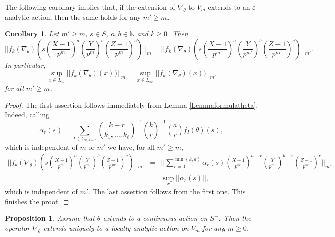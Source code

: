 \documentclass[10pt, oneside]{amsart}
\numberwithin{equation}{subsection}
\newtheorem{proposition}[equation]{Proposition}
\newtheorem{corollary}[equation]{Corollary}
\theoremstyle{definition}
\theoremstyle{remark}
\def\N{{\mathbb{N}}}
\def\epsilon{\varepsilon}
\begin{document}
The following corollary implies that, if the extension of $\nabla_\theta$ to $V_m$ extends to an $\epsilon$-analytic action, then the same holds for any $m' \geq m$.

\begin{corollary} \label{Corollarycomparisonnorms}
Let $m' \geq m$, $s \in S$, $a,b \in \N$ and $k \geq 0$. Then
\[ \bigg|\! \bigg| f_k(\nabla_\theta) \left(s \left(\frac{X - 1}{p^m}\right)^a \left( \frac{Y}{p^m} \right)^b \left( \frac{Z - 1}{p^m}\right)^c \right) \bigg| \! \bigg|_{m} =  \bigg| \! \bigg| f_k(\nabla_\theta) \left(s \left(\frac{X - 1}{p^{m'}}\right)^a \left( \frac{Y}{p^{m'}} \right)^b \left( \frac{Z - 1}{p^{m'}}\right)^c  \right) \bigg| \! \bigg|_{m'}. \]
In particular,
\[ \sup_{x \in L_{m}} |\! | f_k(\nabla_\theta) (x)) |\!|_m = \sup_{x \in L_{m'}} |\!| f_k(\nabla_\theta) (x))|\!|_{m'}\]
for all $m' \geq m$.
\end{corollary}

\begin{proof}
The first assertion follows immediately from Lemma \ref{Lemmaformulatheta}. Indeed, calling
\[ \alpha_r(s) = \sum_{I \in \Sigma_{k, k-r}} \binom{k - r}{k_1, \ldots, k_\ell}^{-1} \binom{k}{r}^{-1} \binom{a}{r}  f_I(\theta)(s), \]
which is independent of $m$ or $m'$
we have, for all $m' \geq m$,
\begin{eqnarray*}
\bigg|\! \bigg| f_k(\nabla_\theta) \left(s \left(\frac{X - 1}{p^{m'}}\right)^a \left( \frac{Y}{p^{m'}} \right)^b \left( \frac{Z - 1}{p^{m'}}\right)^c \right) \bigg| \! \bigg|_{m'} &=& \bigg|\!\bigg| \sum_{r = 0}^{\min(k, a)} \alpha_{r}(s) \left(\frac{X - 1}{p^{m'}}\right)^{a-r} \left( \frac{Y}{p^{m'}} \right)^{b+r} \left( \frac{Z - 1}{p^{m'}}\right)^c  \bigg|\! \bigg|_{m'}  \\
&=& \sup_{r} |\!|\alpha_r(s)|\!|,
\end{eqnarray*}
which is independent of $m'$. The last assertion follows from the first one. This finishes the proof.
\end{proof}

\begin{proposition} \label{Proplocanextension1}
Assume that $\theta$ extends to a continuous action on $S^+$. Then the operator $\nabla_\theta$ extends uniquely to a locally analytic action on $V_m$ for any $m \geq 0$.
\end{proposition}
\end{document}
